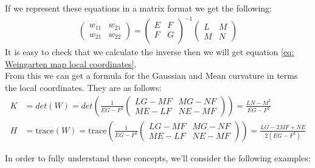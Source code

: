 \documentclass{article}
\theoremstyle{plain}
\theoremstyle{definition}
\theoremstyle{remark}
\begin{document}
If we represent these equations in a matrix format we get the following: 
\begin{align*}
    \begin{pmatrix}
        w_{11} & w_{21} \\
        w_{21} & w_{22} 
    \end{pmatrix} = 
    \begin{pmatrix}
        E & F \\
        F & G \\
    \end{pmatrix}^{-1}
    \begin{pmatrix}
        L & M \\
        M & N 
    \end{pmatrix}
\end{align*}
It is easy to check that we calculate the inverse then we will get equation \ref{eq: Weingarten map local coordinates}. \\

From this we can get a formula for the Gaussian and Mean curvature in terms the local coordinates. They are as follows:
\begin{align*}
    K & = det(W) = det\left( \frac{1}{EG-F^2} \begin{pmatrix}
        LG - MF & MG - NF \\
        ME - LF & NE- MF
    \end{pmatrix} \right) = \frac{LN-M^2}{EG-F^2} \\
    H & = \text{trace}(W) = \text{trace}\left(\frac{1}{EG-F^2} \begin{pmatrix}
        LG - MF & MG - NF \\
        ME - LF & NE- MF
    \end{pmatrix} \right) = \frac{LG-2MF+NE}{2(EG-F^2)}
\end{align*}

In order to fully understand these concepts, we'll consider the following examples:
\end{document}
